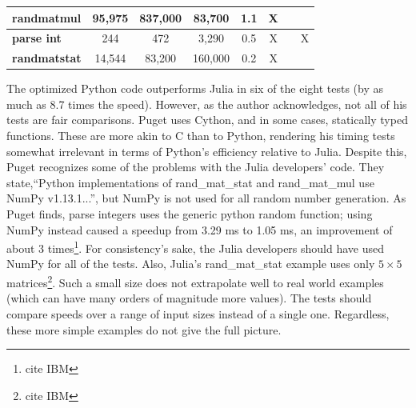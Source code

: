 \documentclass[10pt]{article}
\begin{document}
\begin{table}[]
\begin{tabular}{|l|c|c|c|c|c|c|c|}
\textbf{randmatmul}          & 95,975         & 837,000                                                          & 83,700                                                               & 1.1                                                                         & X              &                &                 \\ \hline
\textbf{parse int}           & 244            & 472                                                              & 3,290                                                                & 0.5                                                                         & X              &                & X               \\ \hline
\textbf{randmatstat}         & 14,544         & 83,200                                                           & 160,000                                                              & 0.2                                                                         & X              &                &                 \\ \hline
\end{tabular}
\end{table}

The optimized Python code outperforms Julia in six of the eight tests (by as much as 8.7 times the speed). However, as the author acknowledges, not all of his tests are fair comparisons. Puget uses Cython, and in some cases, statically typed functions. These are more akin to C than to Python, rendering his timing tests somewhat irrelevant in terms of Python's efficiency relative to Julia. Despite this, Puget recognizes some of the problems with the Julia developers' code. They state,``Python implementations of rand\_mat\_stat and rand\_mat\_mul use NumPy v1.13.1...'', but NumPy is not used for all random number generation. As Puget finds, parse integers uses the generic python random function; using NumPy instead caused a speedup from 3.29 ms to 1.05 ms, an improvement of about 3 times\footnote{cite IBM}. For consistency's sake, the Julia developers should have used NumPy for all of the tests. Also, Julia's rand\_mat\_stat example uses only $5 \times 5$ matrices\footnote{cite IBM}. Such a small size does not extrapolate well to real world examples (which can have many orders of magnitude more values). The tests should compare speeds over a range of input sizes instead of a single one. Regardless, these more simple examples do not give the full picture.
\end{document}
